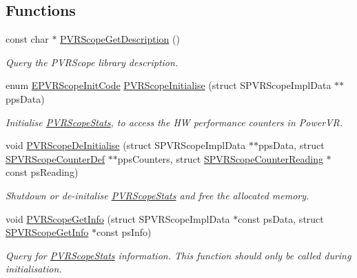 \subsection*{Functions}
\begin{DoxyCompactItemize}
\item 
\hypertarget{group___scope_stats_ga409deb795bfd7df5ba2ce469c4a6e38c}{const char $\ast$ \hyperlink{group___scope_stats_ga409deb795bfd7df5ba2ce469c4a6e38c}{P\+V\+R\+Scope\+Get\+Description} ()}\label{group___scope_stats_ga409deb795bfd7df5ba2ce469c4a6e38c}

\begin{DoxyCompactList}\small\item\em Query the P\+V\+R\+Scope library description. \end{DoxyCompactList}\item 
enum \hyperlink{group___scope_stats_gae53be0f580f9e1088efc1c06d94002d3}{E\+P\+V\+R\+Scope\+Init\+Code} \hyperlink{group___scope_stats_ga2e43fb3eacff1d4a3993343ef0712068}{P\+V\+R\+Scope\+Initialise} (struct S\+P\+V\+R\+Scope\+Impl\+Data $\ast$$\ast$pps\+Data)
\begin{DoxyCompactList}\small\item\em Initialise \hyperlink{group___scope_stats}{P\+V\+R\+Scope\+Stats}, to access the H\+W performance counters in Power\+V\+R. \end{DoxyCompactList}\item 
void \hyperlink{group___scope_stats_ga15e5e7430519429dc947583cd61ccbce}{P\+V\+R\+Scope\+De\+Initialise} (struct S\+P\+V\+R\+Scope\+Impl\+Data $\ast$$\ast$pps\+Data, struct \hyperlink{struct_s_p_v_r_scope_counter_def}{S\+P\+V\+R\+Scope\+Counter\+Def} $\ast$$\ast$pps\+Counters, struct \hyperlink{struct_s_p_v_r_scope_counter_reading}{S\+P\+V\+R\+Scope\+Counter\+Reading} $\ast$const ps\+Reading)
\begin{DoxyCompactList}\small\item\em Shutdown or de-\/initalise \hyperlink{group___scope_stats}{P\+V\+R\+Scope\+Stats} and free the allocated memory. \end{DoxyCompactList}\item 
void \hyperlink{group___scope_stats_ga2935f4d8b13a9f53a5db81fd833c9d77}{P\+V\+R\+Scope\+Get\+Info} (struct S\+P\+V\+R\+Scope\+Impl\+Data $\ast$const ps\+Data, struct \hyperlink{struct_s_p_v_r_scope_get_info}{S\+P\+V\+R\+Scope\+Get\+Info} $\ast$const ps\+Info)
\begin{DoxyCompactList}\small\item\em Query for \hyperlink{group___scope_stats}{P\+V\+R\+Scope\+Stats} information. This function should only be called during initialisation. \end{DoxyCompactList}\item 
$$
\end{DoxyCompactItemize}
